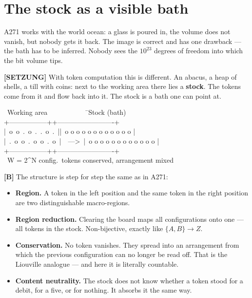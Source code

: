 \section{The stock as a visible bath}

A271 works with the world ocean: a glass is poured in, the volume does not vanish,
but nobody gets it back. The image is correct and has one drawback --- the bath
has to be inferred. Nobody sees the $10^{23}$ degrees of freedom into which the
bit volume tips.

\textbf{[SETZUNG]} With token computation this is different. An abacus, a heap of shells, a till
with coins: next to the working area there lies a \textbf{stock}. The tokens come
from it and flow back into it. The stock is a bath one can point at.

\begin{center}
\begin{minipage}{0.80\textwidth}
\ttfamily\small
\begin{tabbing}
\ Working area\ \ \ \ \ \ \ \ \ \ \ \=\ Stock (bath)\\[0.3em]
+-----------------+\>+-------------------------+\\
|\ o\ o\ .\ o\ .\ .\ o\ .\ |\>|\ o o o o o o o o o o o o |\\
|\ .\ o\ o\ .\ o\ o\ .\ o\ |\ \ ---\textgreater\ \>|\ o o o o o o o o o o o o |\\
+-----------------+\>+-------------------------+\\
\ W = 2\^{}N config.\>\ tokens conserved, arrangement mixed
\end{tabbing}
\end{minipage}
\end{center}

\textbf{[B]} The structure is step for step the same as in A271:

\begin{itemize}[leftmargin=1.4em,itemsep=0.3em]
  \item \textbf{Region.} A token in the left position and the same token in the
        right position are two distinguishable macro-regions.
  \item \textbf{Region reduction.} Clearing the board maps all configurations onto
        one --- all tokens in the stock. Non-bijective, exactly like
        $\{A,B\}\to Z$.
  \item \textbf{Conservation.} No token vanishes. They spread into an arrangement
        from which the previous configuration can no longer be read off. That is
        the Liouville analogue --- and here it is literally countable.
  \item \textbf{Content neutrality.} The stock does not know whether a token stood
        for a debit, for a five, or for nothing. It absorbs it the same way.
\end{itemize}

